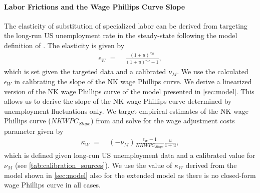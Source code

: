 \documentclass[12pt,3p,authoryear,review]{elsarticle}
\begin{document}
\begin{small}
\paragraph{Labor Frictions and the Wage Phillips Curve Slope}%
The elasticity of substitution of specialized labor can be derived from targeting the long-run US unemployment rate in the steady-state following the model definition of \cite{gali2011unemployment}. The elasticity is given by%
\begin{align}%
	\epsilon_W \; = & \; \frac{\left(1+u\right)^{\nu_M}}{\left(1+u\right)^{\nu_M}-1},%
\end{align}%
which is set given the targeted data and a calibrated $\nu_M$. We use the calculated $\epsilon_W$ in calibrating the slope of the NK wage Phillips curve. We derive a linearized version of the NK wage Phillips curve of the model presented in \cref{sec:model}. This allows us to derive the slope of the NK wage Phillips curve determined by unemployment fluctuations only. We target empirical estimates of the NK wage Phillips curve ($NKWPC_{Slope}$) from \cite{galiHasUSWage2019} and solve for the wage adjustment costs parameter given by%
\begin{align}%
	\kappa_W \; = & \; (-\nu_M) \frac{\epsilon_W-1}{NKWPC_{Slope}} \frac{u}{1+u},%
\end{align}%
which is defined given long-run US unemployment data and a calibrated value for $\nu_M$ (see \cref{tab:calibration_sources}). We use the value of $\kappa_W$ derived from the model shown in \cref{sec:model} also for the extended model as there is no closed-form wage Phillips curve in all cases.%

\end{small}
\end{document}
